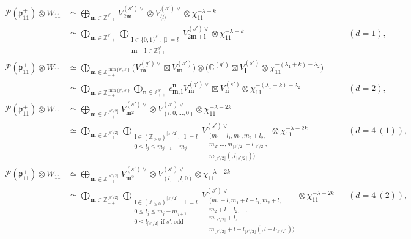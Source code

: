 \documentclass[pdftex]{sigma}
\numberwithin{equation}{section}
\newcommand{\bl}{\mathbf{l}}
\newcommand{\bm}{\mathbf{m}}
\newcommand{\bn}{\mathbf{n}}
\newcommand{\BZ}{\mathbb{Z}}
\newcommand{\BC}{\mathbb{C}}
\newcommand{\fp}{\mathfrak{p}}
\newcommand{\cP}{\mathcal{P}}
\begin{document}
\begin{align*}
\cP(\fp^+_{11})\otimes W_{11}
&\simeq\bigoplus_{\bm\in\BZ_{++}^{s'}} V_{2\bm}^{(s')\vee}\otimes V_{\langle l\rangle}^{(s')\vee}\otimes\chi_{11}^{-\lambda-k}\\
& \simeq\bigoplus_{\bm\in\BZ_{++}^{s'}}\bigoplus_{\substack{\bl\in\{0,1\}^{s'},\; |\bl|=l\\ \bm+\bl\in\BZ_{++}^{s'}}}
V_{2\bm+\bl}^{(s')\vee}\otimes \chi_{11}^{-\lambda-k} && (d=1),\\
\cP(\fp^+_{11})\otimes W_{11}
&\simeq\bigoplus_{\bm\in\BZ_{++}^{\min\{q',s'\}}} \big(V_{\bm}^{(q')\vee}\boxtimes V_{\bm}^{(s')}\big)
\otimes \big(\BC^{(q')}\boxtimes V_\bl^{(s')}\otimes\chi_{11}^{-(\lambda_1+k)-\lambda_2}\big) \\
&\simeq\bigoplus_{\bm\in\BZ_{++}^{\min\{q',s'\}}}\bigoplus_{\bn\in\BZ_{++}^{s'}}
c_{\bm,\bl}^\bn V_{\bm}^{(q')\vee}\boxtimes V_\bn^{(s')}\otimes\chi_{11}^{-(\lambda_1+k)-\lambda_2} &&(d=2),\\
\cP(\fp^+_{11})\otimes W_{11}
&\simeq\bigoplus_{\bm\in\BZ_{++}^{\lfloor s'/2\rfloor}} V_{\bm^2}^{(s')\vee}\otimes V_{(l,0,\ldots,0)}^{(s')\vee}\otimes\chi_{11}^{-\lambda-2k}\\
&\simeq\bigoplus_{\bm\in\BZ_{++}^{\lfloor s'/2\rfloor}}
\bigoplus_{\substack{\bl\in(\BZ_{\ge 0})^{\lceil s'/2\rceil},\; |\bl|=l\\ 0\le l_j\le m_{j-1}-m_j}}
V_{\substack{(m_1+l_1,m_1,m_2+l_2,\\
m_2,\ldots,m_{\lfloor s'/2\rfloor}+l_{\lfloor s'/2\rfloor},\\ m_{\lfloor s'/2\rfloor}(,l_{\lceil s'/2\rceil}))}}^{(s')\vee}
\otimes\chi_{11}^{-\lambda-2k} &&(d=4\ (1)), \\
\cP(\fp^+_{11})\otimes W_{11}
&\simeq\bigoplus_{\bm\in\BZ_{++}^{\lfloor s'/2\rfloor}} V_{\bm^2}^{(s')\vee}\otimes V_{(l,\ldots,l,0)}^{(s')\vee}
\otimes \chi_{11}^{-\lambda-2k}\\
&\simeq\bigoplus_{\bm\in\BZ_{++}^{\lfloor s'/2\rfloor}}
\bigoplus_{\substack{\bl\in(\BZ_{\ge 0})^{\lceil s'/2\rceil},\; |\bl|=l\\ 0\le l_j\le m_j-m_{j+1}\\
0\le l_{\lceil s'/2\rceil} \text{ if }s'\colon \text{odd}}}
V_{\substack{(m_1+l,m_1+l-l_1,m_2+l,\\
m_2+l-l_2,\ldots, \\ m_{\lfloor s'/2\rfloor}+l,\\ m_{\lfloor s'/2\rfloor}+l-l_{\lfloor s'/2\rfloor}
(,l-l_{\lceil s'/2\rceil}))}}^{(s')\vee}
\otimes \chi_{11}^{-\lambda-2k}\! &&(d=4\ (2)), \\

\end{align*}
\end{document}
